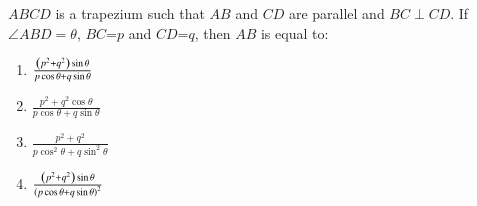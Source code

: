 \item $ABCD$ is a trapezium such that $AB$ and $CD$ are parallel and $BC\perp CD$. If $\angle ABD=\theta$, $BC$=$p$ and $CD$=$q$, then $AB$ is equal to:
\hfill{}
\begin{multicols}{2} 
\begin{enumerate}
\item $\frac{\left(p^2+q^2\right)\sin\theta}{p\cos\theta+q\sin\theta}$
\item $\frac{p^2+q^2\cos\theta}{p\cos\theta+q\sin\theta}$
\columnbreak
\item $\frac{p^2+q^2}{p\cos^2 \theta+q\sin^2 \theta}$
\item $\frac{\left(p^2+q^2\right)\sin\theta}{\left(p\cos\theta+q\sin\theta\right)^2}$
\end{enumerate}
\end{multicols}
